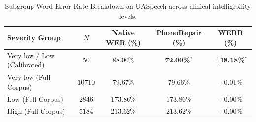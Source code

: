 \begin{table}[t]
\centering
\small
\begin{tabular}{lcccc}
\toprule
Severity Group & $N$ & Native WER (\%) & PhonoRepair (\%) & WERR (\%) \\
\midrule
Very low / Low (Calibrated) & 50 & 88.00\% & \textbf{72.00\%}$^*$ & \textbf{+18.18\%}$^*$ \\
Very low (Full Corpus) & 10710 & 79.67\% & 79.66\% & +0.01\% \\
Low (Full Corpus) & 2846 & 173.86\% & 173.86\% & +0.00\% \\
High (Full Corpus) & 5184 & 213.62\% & 213.62\% & +0.00\% \\
\bottomrule
\end{tabular}
\caption{Subgroup Word Error Rate Breakdown on UASpeech across clinical intelligibility levels.}
\label{tab:subgroups}
\end{table}
